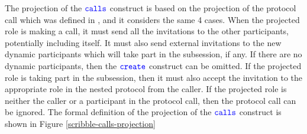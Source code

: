 \documentclass[12pt,twoside]{report}
\begin{document}
The projection of the ${\color{blue}\mathtt{calls}}$ construct is based on the projection of the protocol call which was defined in \cite{nestedprotocols}, and it considers the same 4 cases. When the projected role is making a call, it must send all the invitations to the other participants, potentially including itself. It must also send external invitations to the new dynamic participants which will take part in the subsession, if any. If there are no dynamic participants, then the ${\color{blue}\mathtt{create}}$ construct can be omitted. If the projected role is taking part in the subsession, then it must also accept the invitation to the appropriate role in the nested protocol from the caller. If the projected role is neither the caller or a participant in the protocol call, then the protocol call can be ignored. The formal definition of the projection of the ${\color{blue}\mathtt{calls}}$ construct is shown in Figure \ref{scribble-calls-projection}\\
 
 
 
 
 
\end{document}
